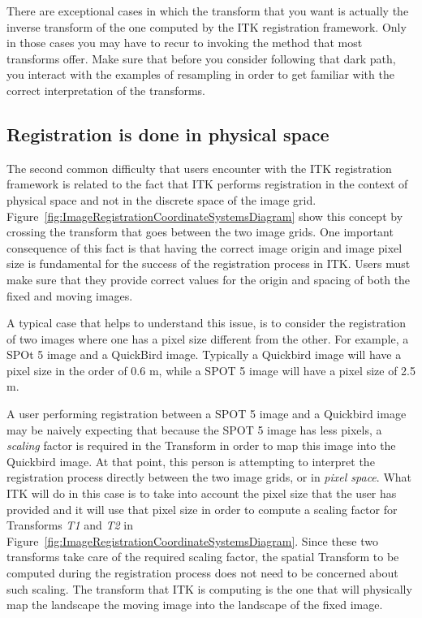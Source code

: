 There are exceptional cases in which the transform that you want is actually
the inverse transform of the one computed by the ITK registration framework.
Only in those cases you may have to recur to invoking the 
method that most transforms offer. Make sure that before you consider following
that dark path, you interact with the examples of resampling in order to get 
familiar with the correct interpretation of the transforms.


\subsection{Registration is done in physical space}
\label{sec:RegistrationIsDoneInPhysicalSpace}

The second common difficulty that users encounter with the ITK registration
framework is related to the fact that ITK performs registration in the context
of physical space and not in the discrete space of the image grid.
Figure~\ref{fig:ImageRegistrationCoordinateSystemsDiagram} show this concept by
crossing the transform that goes between the two image grids. One important
consequence of this fact is that having the correct image origin and image
pixel size is fundamental for the success of the registration process in ITK.
Users must make sure that they provide correct values for the origin and
spacing of both the fixed and moving images.

A typical case that helps to understand this issue, is to consider the
registration of two images where one has a pixel size different from the other.
For example, a SPOt 5 image and a
QuickBird image. Typically a Quickbird image will
have a pixel size in the order of 0.6 m, while a SPOT 5 image will have a
pixel size of 2.5 m.

A user performing registration between a SPOT 5 image and a Quickbird image may be
naively expecting that because the SPOT 5 image has less pixels, a {\em scaling}
factor is required in the Transform in order to map this image into the Quickbird
image. At that point, this person is attempting to interpret the registration
process directly between the two image grids, or in {\em pixel space}. What ITK
will do in this case is to take into account the pixel size that the user has
provided and it will use that pixel size in order to compute a scaling factor
for Transforms {\em T1} and {\em T2} in
Figure~\ref{fig:ImageRegistrationCoordinateSystemsDiagram}. Since these two
transforms take care of the required scaling factor, the spatial Transform to
be computed during the registration process does not need to be concerned about
such scaling. The transform that ITK is computing is the one that will
physically map the landscape the moving image into the landscape of the fixed
image.

